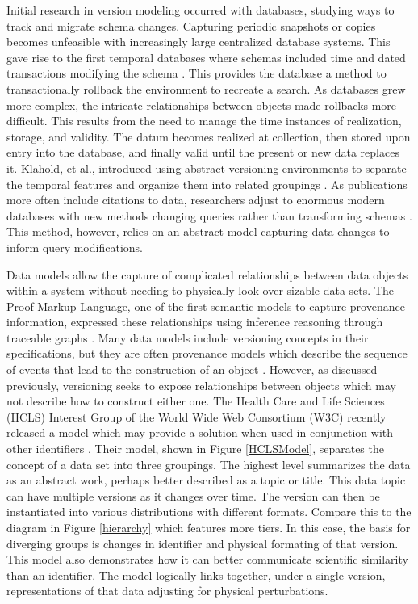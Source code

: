 Initial research in version modeling occurred with databases, studying ways to track and migrate schema changes.
Capturing periodic snapshots or copies becomes unfeasible with increasingly large centralized database systems.
This gave rise to the first temporal databases where schemas included time and dated transactions modifying the schema \cite{roddick1996model}.
This provides the database a method to transactionally rollback the environment to recreate a search.
As databases grew more complex, the intricate relationships between objects made rollbacks more difficult.
This results from the need to manage the time instances of realization, storage, and validity.
The datum becomes realized at collection, then stored upon entry into the database, and finally valid until the present or new data replaces it.
Klahold, et al., introduced using abstract versioning environments to separate the temporal features and organize them into related groupings \cite{Klahold:1986:GMV:645913.671314}.
As publications more often include citations to data, researchers adjust to enormous modern databases with new methods changing queries rather than transforming schemas \cite{Proell2013} \cite{DBLP:conf/data/2013}.
This method, however, relies on an abstract model capturing data changes to inform query modifications.

Data models allow the capture of complicated relationships between data objects within a system without needing to physically look over sizable data sets.
The Proof Markup Language, one of the first semantic models to capture provenance information, expressed these relationships using inference reasoning through traceable graphs \cite{daSilva2006381}.
Many data models include versioning concepts in their specifications, but they are often provenance models which describe the sequence of events that lead to the construction of an object \cite{dai2014provenance}.
However, as discussed previously, versioning seeks to expose relationships between objects which may not describe how to construct either one.
The Health Care and Life Sciences (HCLS) Interest Group of the World Wide Web Consortium (W3C) recently released a model which may provide a solution when used in conjunction with other identifiers \cite{Dummontier2016}.
Their model, shown in Figure \ref{HCLSModel}, separates the concept of a data set into three groupings.
The highest level summarizes the data as an abstract work, perhaps better described as a topic or title.
This data topic can have multiple versions as it changes over time.
The version can then be instantiated into various distributions with different formats.
Compare this to the diagram in Figure \ref{hierarchy} which features more tiers.
In this case, the basis for diverging groups is changes in identifier and physical formating of that version.
This model also demonstrates how it can better communicate scientific similarity than an identifier.
The model logically links together, under a single version, representations of that data adjusting for physical perturbations.

